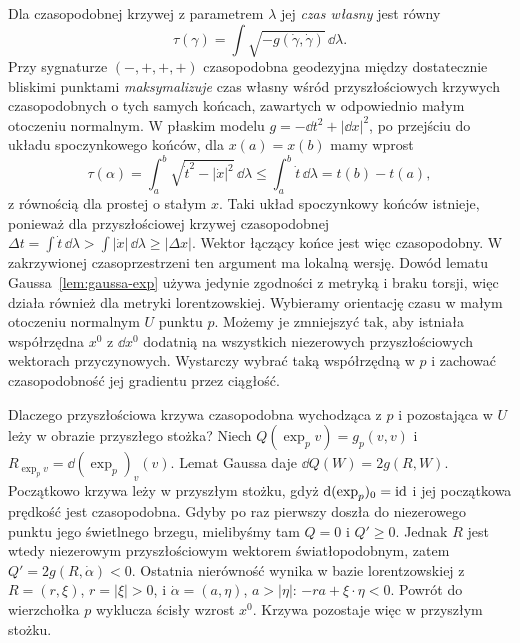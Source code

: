 Dla czasopodobnej krzywej z parametrem $\lambda$
jej \emph{czas własny} jest równy
\begin{equation}\label{eq:czas-wlasny}
 \tau(\gamma)=\int\sqrt{-g(\dot\gamma,\dot\gamma)}
                    \,\dd\lambda.
\end{equation}
Przy sygnaturze $(-,+,+,+)$ czasopodobna
geodezyjna między dostatecznie bliskimi
punktami \emph{maksymalizuje} czas własny
wśród przyszłościowych krzywych czasopodobnych o tych samych
końcach, zawartych w odpowiednio małym otoczeniu normalnym. W płaskim modelu
$g=-\dd t^2+|\dd x|^2$, po przejściu do
układu spoczynkowego końców, dla
$x(a)=x(b)$ mamy wprost
\[
 \tau(\alpha)=\int_a^b
 \sqrt{\dot t^2-|\dot x|^2}\,\dd\lambda
 \leq\int_a^b\dot t\,\dd\lambda=t(b)-t(a),
\]
z równością dla prostej o stałym $x$.
Taki układ spoczynkowy końców istnieje, ponieważ
dla przyszłościowej krzywej czasopodobnej
$\Delta t=\int\dot t\,\dd\lambda
>\int|\dot x|\,\dd\lambda\geq|\Delta x|$.
Wektor łączący końce jest więc czasopodobny.
W zakrzywionej czasoprzestrzeni ten argument
ma lokalną wersję. Dowód lematu
Gaussa~\ref{lem:gaussa-exp} używa jedynie
zgodności z metryką i braku torsji, więc
działa również dla metryki lorentzowskiej.
Wybieramy orientację czasu w małym otoczeniu normalnym $U$
punktu $p$. Możemy je zmniejszyć tak, aby istniała współrzędna
$x^0$ z $\dd x^0$ dodatnią na wszystkich niezerowych
przyszłościowych wektorach przyczynowych. Wystarczy wybrać taką współrzędną
w $p$ i zachować czasopodobność jej gradientu przez ciągłość.

Dlaczego przyszłościowa krzywa czasopodobna wychodząca z $p$
i pozostająca w $U$ leży w obrazie przyszłego stożka?
Niech $Q(\exp_p v)=g_p(v,v)$ i $R_{\exp_p v}=\dd(\exp_p)_v(v)$.
Lemat Gaussa daje $\dd Q(W)=2g(R,W)$.
Początkowo krzywa leży w przyszłym stożku, gdyż
$\mathrm d(\exp_p)_0=\mathrm{id}$ i jej początkowa prędkość jest czasopodobna.
Gdyby po raz pierwszy doszła do niezerowego punktu jego
świetlnego brzegu, mielibyśmy tam $Q=0$ i $Q'\geq0$.
Jednak $R$ jest wtedy niezerowym przyszłościowym wektorem
światłopodobnym, zatem $Q'=2g(R,\dot\alpha)<0$.
Ostatnia nierówność wynika w bazie lorentzowskiej z
$R=(r,\xi)$, $r=|\xi|>0$, i $\dot\alpha=(a,\eta)$,
$a>|\eta|$: $-ra+\xi\cdot\eta<0$.
Powrót do wierzchołka $p$ wyklucza ścisły wzrost $x^0$.
Krzywa pozostaje więc w przyszłym stożku.

